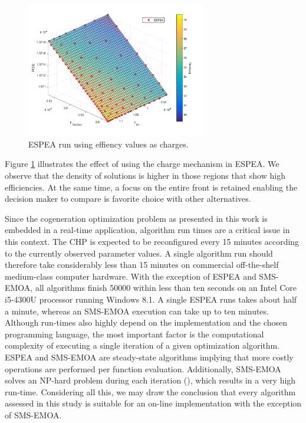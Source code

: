 \begin{figure}
\centering
\includegraphics[width=0.7\textwidth]{figures/espea-charge.pdf}
\caption{ESPEA run using effiency values as charges.}
\label{fig:espea}
\end{figure}

Figure \ref{fig:espea} illustrates the effect of using the charge mechanism in ESPEA. We observe that the density of solutions is higher in those regions that show high efficiencies. At the same time, a focus on the entire front is retained enabling the decision maker to compare is favorite choice with other alternatives.

Since the cogeneration optimization problem as presented in this work is embedded in a real-time application, algorithm run times are a critical issue in this context. The CHP is expected to be reconfigured every 15 minutes according to the currently observed parameter values. A single algorithm run should therefore take considerably less than 15 minutes on commercial off-the-shelf medium-class computer hardware. With the exception of ESPEA and SMS-EMOA, all algorithms finish \num{50000} within less than ten seconds on an Intel Core i5-4300U processor running Windows 8.1. A single ESPEA runs takes about half a minute, whereas an SMS-EMOA execution can take up to ten minutes. Although run-times also highly depend on the implementation and the chosen programming language, the most important factor is the computational complexity of executing a single iteration of a given optimization algorithm. ESPEA and SMS-EMOA are steady-state algorithms implying that more costly operations are performed per function evaluation. Additionally, SMS-EMOA solves an NP-hard problem during each iteration (\cite{hypervolumecontribution}), which results in a very high run-time. Considering all this, we may draw the conclusion that every algorithm assessed in this study is suitable for an on-line implementation with the exception of SMS-EMOA.


